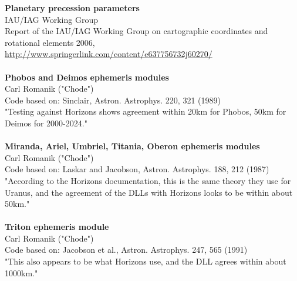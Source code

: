 \documentclass[Orbiter User Manual.tex]{subfiles}
\begin{document}
\textbf{Planetary precession parameters}\\
IAU/IAG Working Group\\
Report of the IAU/IAG Working Group on cartographic coordinates and rotational elements 2006, \url{http://www.springerlink.com/content/e637756732j60270/}\\
\\
\textbf{Phobos and Deimos ephemeris modules}\\
Carl Romanik ("Chode")\\
Code based on: Sinclair, Astron. Astrophys. 220, 321 (1989)\\
"Testing against Horizons shows agreement within 20km for Phobos, 50km for Deimos for 2000-2024."\\
\\
\textbf{Miranda, Ariel, Umbriel, Titania, Oberon ephemeris modules}\\
Carl Romanik ("Chode")\\
Code based on: Laskar and Jacobson, Astron. Astrophys. 188, 212 (1987)\\
"According to the Horizons documentation, this is the same theory they use for Uranus, and the agreement of the DLLs with Horizons looks to be within about 50km."\\
\\
\textbf{Triton ephemeris module}\\
Carl Romanik ("Chode")\\
Code based on: Jacobson et al., Astron. Astrophys. 247, 565 (1991)\\
"This also appears to be what Horizons use, and the DLL agrees within about 1000km."
\\
\end{document}
